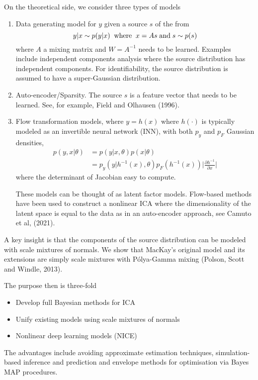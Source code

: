 \documentclass[11pt]{article}%
\begin{document}
On the theoretical side, we consider three types of models 
\begin{enumerate}
\item Data generating model for $y$ given a source $s$ of the from 
$$
 y | x \sim p( y| x ) \; \; {\rm where} \; \; x= As \; {\rm and} \; s \sim p(s) 
 $$
where  $A$ a mixing matrix and $ W = A^{-1} $ needs to be learned.
Examples include independent components analysis where the source distribution has independent components. 
For identifiability, the source distribution is assumed to have a super-Gaussian distribution. 
\item Auto-encoder/Sparsity. The source $s$ is a feature vector that needs to be learned. 
See, for example,  Field and Olhausen (1996). 
\item Flow transformation models, where $ y = h(x) $ where $h( \cdot ) $ is typically modeled as an  invertible neural network (INN), with both $p_y$ and $p_F$ Gaussian densities, 
	\begin{align*}
		p( y, x | \theta) &= p(y | x, \theta)p(x|\theta)\\
		&= p_y(y | h^{-1}(x), \theta) p_F(h^{-1}(x)) \Big | \frac{\partial h^{-1}}{\partial x}\Big | 
	\end{align*}
	 where the determinant of Jacobian easy to compute. 
	
	These models can be thought of as latent factor models. 
Flow-based methods have been used to construct a nonlinear ICA where the dimensionality of the latent space is equal to the data as in an 
 auto-encoder approach, see Camuto et al, (2021).
\end{enumerate}
A  key insight is that the components of the source  distribution can be modeled with scale mixtures of normals.  We show that MacKay's original model and its extensions are
simply scale mixtures with P\'olya-Gamma mixing (Polson, Scott and Windle, 2013). 

The purpose then is three-fold
\begin{itemize}
\item Develop full Bayesian methods for ICA
\item Unify existing models using scale mixtures of normals   
\item Nonlinear deep learning models (NICE)
\end{itemize}
The  advantages include avoiding approximate estimation techniques, simulation-based inference and prediction and envelope methods for optimisation via Bayes MAP procedures.
\end{document}
